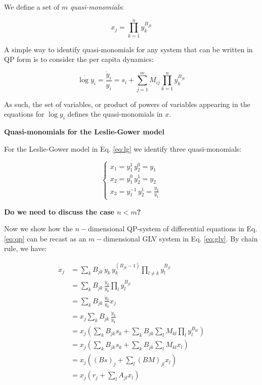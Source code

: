\documentclass{article}
\begin{document}
\label{sec:qptoglv}

We define a set of \(m\) \emph{quasi-monomials}:

\begin{equation}
\label{eq:quasimono}
x_j = \prod_{k=1}^n y_k^{B_{jk}}
\end{equation}

A simple way to identify quasi-monomials for any system that can be
written in QP form is to consider the per capita dynamics:

\begin{equation}
\dot{\log y}_i = \frac{\dot{y}_i}{y_i} = s_i + \sum_{j = 1}^m M_{ij} \prod_{k = 1}^n y_k^{B_{jk}}
\end{equation}

As such, the set of variables, or product of powers of variables
appearing in the equations for \(\dot{\log y}_i\) defines the
quasi-monomials in \(x\).

\begin{cb}
\textbf{Quasi-monomials for the Leslie-Gower model}

For the Leslie-Gower model in Eq. \ref{eq:lg} we identify three quasi-monomials:

\begin{equation}
\label{eq:lgqm}
\begin{cases}
x_1 = y_1^1 \, y_2^0 = y_1\\
x_2 = y_1^0 \, y_2^1 = y_2\\
x_3 = y_1^{-1} \, y_2^1 = \frac{y_2}{y_1}
\end{cases}
\end{equation}

\end{cb}

\textbf{Do we need to discuss the case \(n < m\)?}

Now we show how the \(n-\)dimensional QP-system of differential
equations in Eq. \ref{eq:qp} can be recast as an \(m-\)dimensional GLV
system in Eq. \ref{eq:glv}. By chain rule, we have:

\begin{equation}
\label{eq:quasimonodt}
\begin{aligned}
\dot{x}_j &= \sum_k B_{jk}\, \dot{y}_k \, y_{k}^{(B_{jk} -1)} \prod_{l \neq k} y_{l}^{B_{jl}}\\
&=\sum_k B_{jk}\, \frac{\dot{y}_k}{y_k} \prod_{l} y_{l}^{B_{jl}}\\
&=\sum_k B_{jk}\, \frac{\dot{y}_k}{y_k} x_j\\
&=x_j \sum_k B_{jk}\, \frac{\dot{y}_k}{y_k} \\
&=x_j \left(\sum_k B_{jk} s_k + \sum_k B_{jk} \sum_l M_{kl} \prod_l y_l^{B_{kl}} \right)\\
&=x_j \left(\sum_k B_{jk} s_k + \sum_k B_{jk} \sum_l M_{kl} x_l \right)\\
&=x_j \left((B s)_j + \sum_l (B M)_{jl} x_l \right)\\
&=x_j \left(r_j + \sum_l A_{jl} x_l \right)
\end{aligned}
\end{equation}
\end{document}
